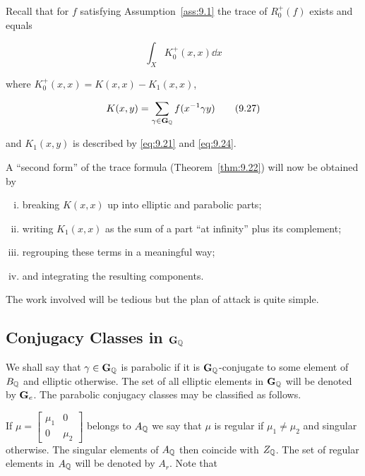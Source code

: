 Recall that for $f$ satisfying Assumption~\ref{ass:9.1} the trace of $R_0^{+}(f)$ exists and equals

\[
\int_X K_0^{+}(x, x)\dd x
\]

where $K_0^{+}(x,x) = K(x,x) - K_1(x,x)$,

\begin{equation}\label{eq:9.27}
K(x, y) = \sum_{\gamma \in \mathbf{G}_{\mathbb{Q}}} f(x^{-1}\gamma y)\tag{9.27}
\end{equation}

and $K_1(x,y)$ is described by \eqref{eq:9.21} and \eqref{eq:9.24}.

A ``second form'' of the trace formula (Theorem~\ref{thm:9.22}) will now be obtained by

\begin{enumerate}[(i)]

\item breaking $K(x,x)$ up into elliptic and parabolic parts;

\item writing $K_1(x,x)$ as the sum of a part ``at infinity'' plus its complement;

\item regrouping these terms in a meaningful way;

\item and integrating the resulting components.

\end{enumerate}

The work involved will be tedious but the plan of attack is quite simple.

\subsection{Conjugacy Classes in \texorpdfstring{$\mathbf{G}_{\mathbb{Q}}$}{G-Q}}

We shall say that $\gamma \in \mathbf{G}_{\mathbb{Q}}$ is parabolic if it is $\mathbf{G}_{\mathbb{Q}}$-conjugate to some element of $B_{\mathbb{Q}}$ and elliptic otherwise. The set of all elliptic elements in $\mathbf{G}_{\mathbb{Q}}$ will be denoted by $\mathbf{G}_e$. The parabolic conjugacy classes may be classified as follows.

If $\mu = \begin{bmatrix} \mu_1 & 0 \\ 0 & \mu_2 \end{bmatrix}$ belongs to $A_{\mathbb{Q}}$ we say that $\mu$ is regular if $\mu_1 \neq \mu_2$ and singular otherwise. The singular elements of $A_{\mathbb{Q}}$ then coincide with $Z_{\mathbb{Q}}$. The set of regular elements in $A_{\mathbb{Q}}$ will be denoted by $A_r$. Note that

